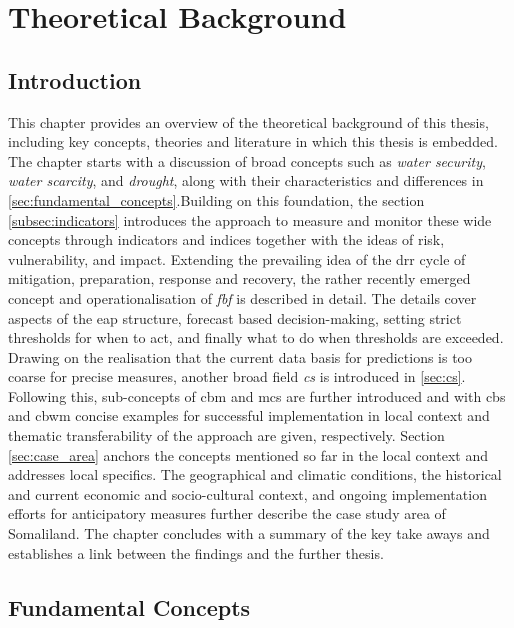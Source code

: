 \chapter{Theoretical Background}

\label{chapter2} 

\section{Introduction}

This chapter provides an overview of the theoretical background of this thesis, including key concepts, theories and literature in which this thesis is embedded. The chapter starts with a discussion of broad concepts such as \textit{water security}, \textit{water scarcity}, and \textit{drought}, along with their characteristics and differences in \autoref{sec:fundamental_concepts}.Building on this foundation, the section \ref{subsec:indicators} introduces the approach to measure and monitor these wide concepts through indicators and indices together with the ideas of risk, vulnerability, and impact. Extending the prevailing idea of the \acrfull{drr} cycle of mitigation, preparation, response and recovery, the rather recently emerged concept and operationalisation of \textit{\acrfull{fbf}} is described in detail. The details cover aspects of the \acrlong{eap} structure, forecast based decision-making, setting strict thresholds for when to act, and finally what to do when thresholds are exceeded.\newline
Drawing on the realisation that the current data basis for predictions is too coarse for precise measures, another broad field \textit{\acrfull{cs}} is introduced in \autoref{sec:cs}. Following this, sub-concepts of \acrfull{cbm} and \acrfull{mcs} are further introduced and with \acrfull{cbs} and \acrfull{cbwm} concise examples for successful implementation in local context and thematic transferability of the approach are given, respectively.\newline
Section \ref{sec:case_area} anchors the concepts mentioned so far in the local context and addresses local specifics. The geographical and climatic conditions, the historical and current economic and socio-cultural context, and ongoing implementation efforts for anticipatory measures further describe the case study area of Somaliland. The chapter concludes with a summary of the key take aways and establishes a link between the findings and the further thesis.


\section{Fundamental Concepts}\label{sec:fundamental_concepts}

